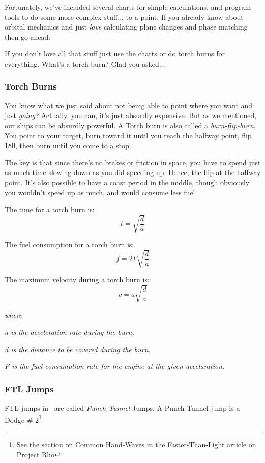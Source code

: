 \par
Fortunately, we've included several charts for simple calculations, and program tools to do some more complex stuff... to a point. If you already know about orbital mechanics and just \textit{love} calculating plane changes and phase matching then go ahead.

\par
If you don't love all that stuff just use the charts or do torch burns for everything. What's a torch burn? Glad you asked...

\subsubsection{Torch Burns}
\par
You know what we just said about not being able to point where you want and just \textit{going?} Actually, you can, it's just absurdly expensive. But as we mentioned, our ships can be absurdly powerful. A Torch burn is also called a \textit{burn-flip-burn}. You point to your target, burn toward it until you reach the halfway point, flip 180\textdegree , then burn until you come to a stop.

\par
The key is that since there's no brakes or friction in space, you have to spend just as much time slowing down as you did speeding up. Hence, the flip at the halfway point. It's also possible to have a coast period in the middle, though obviously you wouldn't speed up as much, and would consume less fuel.

\par
The time for a torch burn is:
\[t = \sqrt{\frac{d}{a}}\]

The fuel consumption for a torch burn is:
\[f = 2F\sqrt{\frac{d}{a}}\]

The maximum velocity during a torch burn is:
\[v = a\sqrt{\frac{d}{a}}\]

\textit{\newline where}
\par\textit{a is the acceleration rate during the burn,}
\par\textit{d is the distance to be covered during the burn,}
\par\textit{F is the fuel consumption rate for the engine at the given accelaration.}

\subsubsection{FTL Jumps}
\par
FTL jumps in \getTitle\, are called \textit{Punch-Tunnel} Jumps. A Punch-Tunnel jump is a Dodge \# 2\footnote{\href{http://www.projectrho.com/public_html/rocket/fasterlight.php\#commonhandwaves}{See the section on Common Hand-Waves in the Faster-Than-Light article on Project Rho}} 

